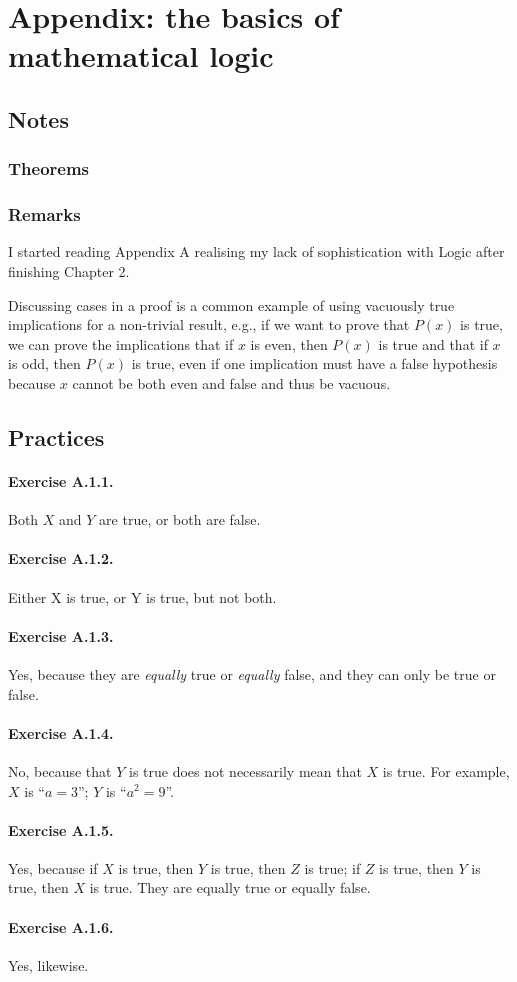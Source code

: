 \section{Appendix: the basics of mathematical logic}
\subsection{Notes}
\subsubsection{Theorems}

\subsubsection{Remarks}
I started reading Appendix A realising my lack of sophistication with Logic after finishing Chapter 2.

Discussing cases in a proof is a common example of using vacuously true implications for a non-trivial result, e.g., if we want to prove that $P(x)$ is true, we can prove the implications that if $x$ is even, then $P(x)$ is true and that if $x$ is odd, then $P(x)$ is true, even if one implication must have a false hypothesis because $x$ cannot be both even and false and thus be vacuous.

\subsection{Practices}
\paragraph{Exercise A.1.1.} Both $X$ and $Y$ are true, or both are false.

\paragraph{Exercise A.1.2.} Either X is true, or Y is true, but not both.

\paragraph{Exercise A.1.3.} Yes, because they are \emph{equally} true or \emph{equally} false, and they can only be true or false.

\paragraph{Exercise A.1.4.} No, because that $Y$ is true does not necessarily mean that $X$ is true. For example, $X$ is ``$a=3$''; $Y$ is ``$a^2=9$''.

\paragraph{Exercise A.1.5.} Yes, because if $X$ is true, then $Y$ is true, then $Z$ is true; if $Z$ is true, then $Y$ is true, then $X$ is true. They are equally true or equally false.

\paragraph{Exercise A.1.6.} Yes, likewise.

